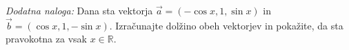 \documentclass[addpoints]{exam}
\begin{document}
\begin{questions}


    \begin{solution}[10cm]

    \end{solution}





    \bonusquestion[3]
    \textit{Dodatna naloga:} Dana sta vektorja $\overrightarrow{a}=(-\cos x, 1, \sin x)$ in $\overrightarrow{b}=(\cos x, 1, -\sin x)$.
    Izračunajte dolžino obeh vektorjev in pokažite, da sta pravokotna za vsak $x\in\mathbb{R}$.

    \begin{solution}[1cm]

    \end{solution}


\end{questions}
\end{document}

